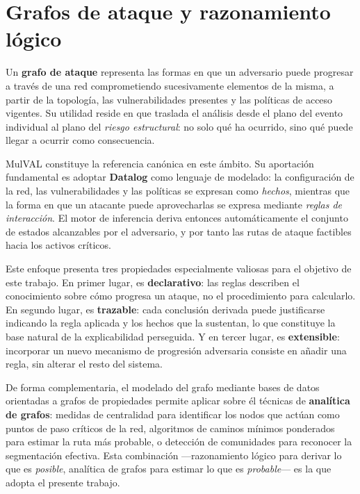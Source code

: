 \section{Grafos de ataque y razonamiento lógico}
\label{sec:grafos}

Un \textbf{grafo de ataque} representa las formas en que un adversario puede progresar a
través de una red comprometiendo sucesivamente elementos de la misma, a partir de la
topología, las vulnerabilidades presentes y las políticas de acceso vigentes. Su utilidad
reside en que traslada el análisis desde el plano del evento individual al plano del
\textit{riesgo estructural}: no solo qué ha ocurrido, sino qué puede llegar a ocurrir como
consecuencia.

MulVAL \cite{mulval} constituye la referencia canónica en este ámbito. Su aportación
fundamental es adoptar \textbf{Datalog} como lenguaje de modelado: la configuración de la
red, las vulnerabilidades y las políticas se expresan como \textit{hechos}, mientras que la
forma en que un atacante puede aprovecharlas se expresa mediante \textit{reglas de
interacción}. El motor de inferencia deriva entonces automáticamente el conjunto de estados
alcanzables por el adversario, y por tanto las rutas de ataque factibles hacia los activos
críticos.

Este enfoque presenta tres propiedades especialmente valiosas para el objetivo de este
trabajo. En primer lugar, es \textbf{declarativo}: las reglas describen el conocimiento
sobre cómo progresa un ataque, no el procedimiento para calcularlo. En segundo lugar, es
\textbf{trazable}: cada conclusión derivada puede justificarse indicando la regla aplicada y
los hechos que la sustentan, lo que constituye la base natural de la explicabilidad
perseguida. Y en tercer lugar, es \textbf{extensible}: incorporar un nuevo mecanismo de
progresión adversaria consiste en añadir una regla, sin alterar el resto del sistema.

De forma complementaria, el modelado del grafo mediante bases de datos orientadas a grafos
de propiedades permite aplicar sobre él técnicas de \textbf{analítica de grafos}: medidas de
centralidad para identificar los nodos que actúan como puntos de paso críticos de la red,
algoritmos de caminos mínimos ponderados para estimar la ruta más probable, o detección de
comunidades para reconocer la segmentación efectiva. Esta combinación —razonamiento lógico
para derivar lo que es \textit{posible}, analítica de grafos para estimar lo que es
\textit{probable}— es la que adopta el presente trabajo.

